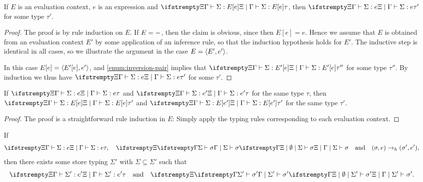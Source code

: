 \begin{lemma}
    \label{lem:subexp-well-typed}
    If $E$ is an evaluation context, $e$ is an expression and $\typerel{\Xi}{\Gamma}{\Sigma}{E[e]}{\tau}$, then $\typerel{\Xi}{\Gamma}{\Sigma}{e}{\tau'}$ for some type $\tau'$.
\end{lemma}

\begin{proof}
    The proof is by rule induction on $E$. If $E = {-}$, then the claim is obvious, since then $E[e] = e$. Hence we assume that $E$ is obtained from an evaluation context $E'$ by some application of an inference rule, so that the induction hypothesis holds for $E'$. The inductive step is identical in all cases, so we illustrate the argument in the case $E = \langle\textcolor{black}{E'},\textcolor{black}{e'}\rangle$.

    In this case $E[e] = \langle\textcolor{black}{E'[e]},\textcolor{black}{e'}\rangle$, and \cref{enum:inversion-pair} implies that $\typerel{\Xi}{\Gamma}{\Sigma}{E'[e]}{\tau''}$ for some type $\tau''$. By induction we thus have $\typerel{\Xi}{\Gamma}{\Sigma}{e}{\tau'}$ for some $\tau'$.
\end{proof}


\begin{lemma}
    \label{lem:evaluation-contexts-respect-types}
    If $\typerel{\Xi}{\Gamma}{\Sigma}{e}{\tau}$ and $\typerel{\Xi}{\Gamma}{\Sigma}{e'}{\tau}$ for the same type $\tau$, then $\typerel{\Xi}{\Gamma}{\Sigma}{E[e]}{\tau'}$ and $\typerel{\Xi}{\Gamma}{\Sigma}{E[e']}{\tau'}$ for the same type $\tau'$.
\end{lemma}

\begin{proof}
    The proof is a straightforward rule induction in $E$: Simply apply the typing rules corresponding to each evaluation context.
\end{proof}


\begin{lemma}
    \label{lem:preservation-head-steps}
    If
    \begin{equation*}
        \typerel{\Xi}{\Gamma}{\Sigma}{e}{\tau},
        \quad
        \stotype{\Xi}{\Gamma}{\Sigma}{\sigma}
        \quad \text{and} \quad
        (\sigma,e) \headstep (\sigma',e'),
    \end{equation*}
    then there exists some store typing $\Sigma'$ with $\Sigma \subseteq \Sigma'$ such that
    \begin{equation*}
        \typerel{\Xi}{\Gamma}{\Sigma'}{e'}{\tau}
        \quad \text{and} \quad
        \stotype{\Xi}{\Gamma}{\Sigma'}{\sigma'}.
    \end{equation*}
\end{lemma}

